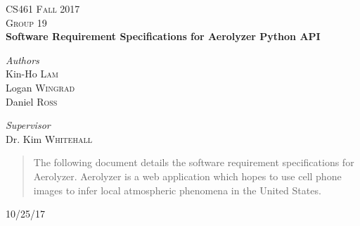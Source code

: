 \documentclass[journal,10pt,draftclsnofoot,onecolumn]{IEEEtran}
\begin{document}
\begin{titlepage}
\newcommand{\HRule}{\rule{\linewidth}{0.4mm}}

\center

\textsc{\Large CS461 Fall 2017 }\\[0.5cm]
\textsc{\large Group 19}\\[0.5cm] %

{\huge\bfseries Software Requirement Specifications for Aerolyzer Python API}\\[0.4cm]

\vfill
\begin{minipage}{0.4\textwidth}
\begin{flushleft}
\large
\textit{Authors}\\
Kin-Ho \textsc{Lam}\\
Logan \textsc{Wingrad}\\
Daniel \textsc{Ross}\\
\end{flushleft}
\end{minipage}

\begin{minipage}{0.4\textwidth}
\begin{flushright}
\large
\textit{Supervisor}\\
Dr. Kim \textsc{Whitehall}
\end{flushright}
\end{minipage}

\vfill

\begin{abstract}
The following document details the software requirement specifications for Aerolyzer. Aerolyzer is a web application which hopes to use cell phone images to infer local atmospheric phenomena in the United States. 
\end{abstract}

\vfill\vfill\vfill
{\large10/25/17}
\vfill
\end{titlepage}

\tableofcontents
\clearpage
\end{document}
